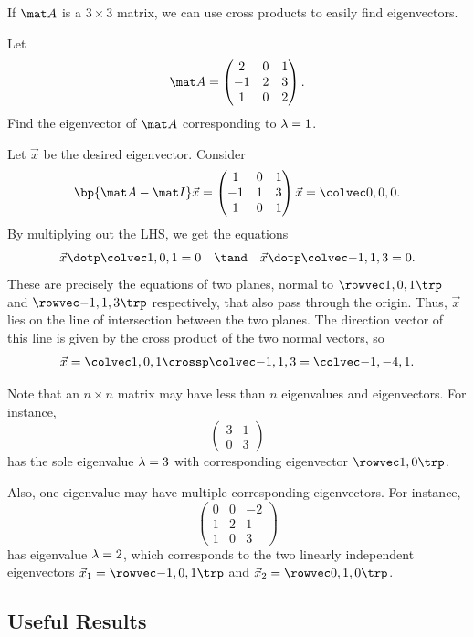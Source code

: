 If $\mat A$ is a $3 \times 3$ matrix, we can use cross products to easily find eigenvectors.

\begin{sample}
    Let \[\mat A = \begin{pmatrix}2 & 0 & 1 \\ -1 & 2 & 3 \\ 1 & 0 & 2\end{pmatrix}.\] Find the eigenvector of $\mat A$ corresponding to $\lambda = 1$.
\end{sample}
\begin{sample}
    Let $\vec x$ be the desired eigenvector. Consider \[\bp{\mat A - \mat I} \vec x = \begin{pmatrix}1 & 0 & 1 \\ -1 & 1 & 3 \\ 1 & 0 & 1\end{pmatrix} \vec x = \cveciii000.\] By multiplying out the LHS, we get the equations \[\vec x \dotp \cveciii101 = 0 \quad \tand \quad \vec x \dotp \cveciii{-1}13 = 0.\] These are precisely the equations of two planes, normal to $\cveciiix101$ and $\cveciiix{-1}13$ respectively, that also pass through the origin. Thus, $\vec x$ lies on the line of intersection between the two planes. The direction vector of this line is given by the cross product of the two normal vectors, so \[\vec x = \cveciii101 \crossp \cveciii{-1}13 = \cveciii{-1}{-4}1.\]
\end{sample}

Note that an $n \times n$ matrix may have less than $n$ eigenvalues and eigenvectors. For instance, \[\begin{pmatrix}3 & 1 \\ 0 & 3\end{pmatrix}\] has the sole eigenvalue $\lambda = 3$ with corresponding eigenvector $\cveciix10$.

Also, one eigenvalue may have multiple corresponding eigenvectors. For instance, \[\begin{pmatrix}0 & 0 & -2 \\ 1 & 2 & 1 \\ 1 & 0 & 3\end{pmatrix}\] has eigenvalue $\lambda = 2$, which corresponds to the two linearly independent eigenvectors $\vec x_1 = \cveciiix{-1}01$ and $\vec x_2 = \cveciiix010$.

\subsection{Useful Results}

